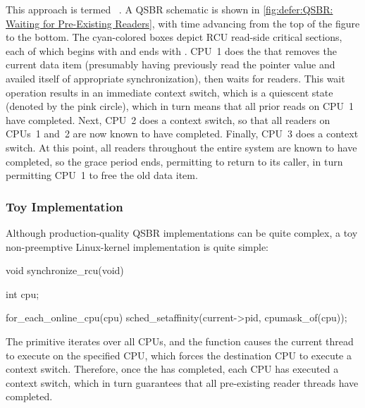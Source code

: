 This approach is termed ~\cite{ThomasEHart2006a}.
A QSBR schematic is shown in
\cref{fig:defer:QSBR: Waiting for Pre-Existing Readers},
with time advancing from the top of the figure to the bottom.
The cyan-colored boxes depict RCU read-side critical sections,
each of which begins with  and ends with
.
CPU~1 does the  that removes the current data
item (presumably having previously read the pointer value and
availed itself of appropriate synchronization), then waits
for readers.
This wait operation results in an immediate context switch, which is a
quiescent state (denoted by the pink circle), which in turn means that
all prior reads on CPU~1 have completed.
Next, CPU~2 does a context switch, so that all readers on CPUs~1 and~2
are now known to have completed.
Finally, CPU~3 does a context switch.
At this point, all readers throughout the entire system are known to have
completed, so the grace period ends, permitting  to
return to its caller, in turn permitting CPU~1 to free the old data item.

\QuickQuizEnd

\subsubsection{Toy Implementation}
\label{sec:defer:Toy Implementation}

Although production-quality QSBR implementations can be quite complex,
a toy non-preemptive Linux-kernel implementation is quite simple:

\begin{VerbatimN}[samepage=true]
void synchronize_rcu(void)
{
	int cpu;

	for_each_online_cpu(cpu)
		sched_setaffinity(current->pid, cpumask_of(cpu));
}
\end{VerbatimN}

The  primitive iterates over all CPUs, and
the  function causes the current thread to
execute on the specified CPU, which forces the destination CPU to execute
a context switch.
Therefore, once the  has completed, each CPU
has executed a context switch, which in turn guarantees that
all pre-existing reader threads have completed.

